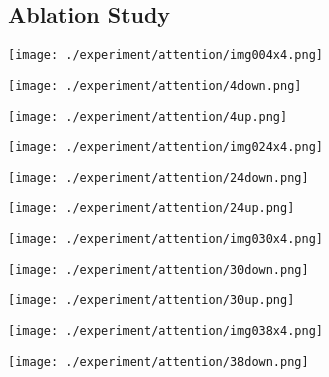 \documentclass[10pt,twocolumn,letterpaper]{article}
\begin{document}
\subsection{Ablation Study}
\begin{figure*}[t]
 \centering
 \begin{minipage}{0.105\textwidth}
    \texttt{[image: ./experiment/attention/img004x4.png]}
 \end{minipage}
 \begin{minipage}{0.105\textwidth}
    \texttt{[image: ./experiment/attention/4down.png]}
 \end{minipage}
 \begin{minipage}{0.105\textwidth}
    \texttt{[image: ./experiment/attention/4up.png]}
 \end{minipage}
 \begin{minipage}{0.105\textwidth}
    \texttt{[image: ./experiment/attention/img024x4.png]}
 \end{minipage}
 \begin{minipage}{0.105\textwidth}
    \texttt{[image: ./experiment/attention/24down.png]}
 \end{minipage}
 \begin{minipage}{0.105\textwidth}
    \texttt{[image: ./experiment/attention/24up.png]}
 \end{minipage}
 \begin{minipage}{0.105\textwidth}
    \texttt{[image: ./experiment/attention/img030x4.png]}
 \end{minipage}
 \begin{minipage}{0.105\textwidth}
    \texttt{[image: ./experiment/attention/30down.png]}
 \end{minipage}
 \begin{minipage}{0.105\textwidth}
    \texttt{[image: ./experiment/attention/30up.png]}
 \end{minipage}
 \begin{minipage}{0.105\textwidth}
    \texttt{[image: ./experiment/attention/img038x4.png]}
 \end{minipage}
 \begin{minipage}{0.105\textwidth}
    \texttt{[image: ./experiment/attention/38down.png]}
 \end{minipage}
 \begin{minipage}{0.105\textwidth}

\end{minipage}
\end{figure*}
\end{document}

